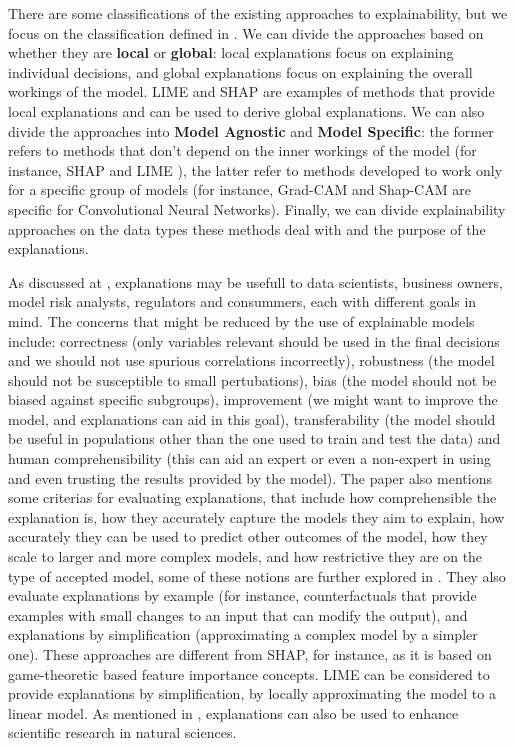 There are some classifications of the existing approaches to explainability, but we focus on the classification defined in \cite{Explainable AI: A Review of Machine Learning Interpretability Methods}. We can divide the approaches based on whether they are \textbf{local} or \textbf{global}: local explanations focus on explaining individual decisions, and global explanations focus on explaining the overall workings of the model. LIME \cite{lime} and SHAP \cite{shap} are examples of methods that provide local explanations and can be used to derive global explanations. We can also divide the approaches into \textbf{Model Agnostic} and \textbf{Model Specific}: the former refers to methods that don't depend on the inner workings of the model (for instance, SHAP \cite{shap} and LIME \cite{lime}), the latter refer to methods developed to work only for a specific group of models (for instance, Grad-CAM and Shap-CAM are specific for Convolutional Neural Networks). Finally, we can divide explainability approaches on the data types these methods deal with and the purpose of the explanations.

As discussed at \cite{Principles and Practice of Explainable Machine Learning}, explanations may be usefull to data scientists, business owners, model risk analysts, regulators and consummers, each with different goals in mind. The concerns that might be reduced by the use of explainable models include: correctness (only variables relevant should be used in the final decisions and we should not use spurious correlations incorrectly), robustness (the model should not be susceptible to small pertubations), bias (the model should not be biased against specific subgroups), improvement (we might want to improve the model, and explanations can aid in this goal), transferability (the model should be useful in populations other than the one used to train and test the data) and human comprehensibility (this can aid an expert or even a non-expert in using and even trusting the results provided by the model). The paper also mentions some criterias for evaluating explanations, that include how comprehensible the explanation is, how they accurately capture the models they aim to explain, how accurately they can be used to predict other outcomes of the model, how they scale to larger and more complex models, and how restrictive they are on the type of accepted model, some of these notions are further explored in \cite{Machine Learning Interpretability: A Survey on Methods and Metrics}. They also evaluate explanations by example (for instance, counterfactuals \cite{CounterExplain} that provide examples with small changes to an input that can modify the output), and explanations by simplification (approximating a complex model by a simpler one). These approaches are different from SHAP, for instance, as it is based on game-theoretic based feature importance concepts. LIME can be considered to provide explanations by simplification, by locally approximating the model to a linear model. As mentioned in \cite{Explainable Machine Learning for Scientific Insights and Discoveries}, explanations can also be used to enhance scientific research in natural sciences.

